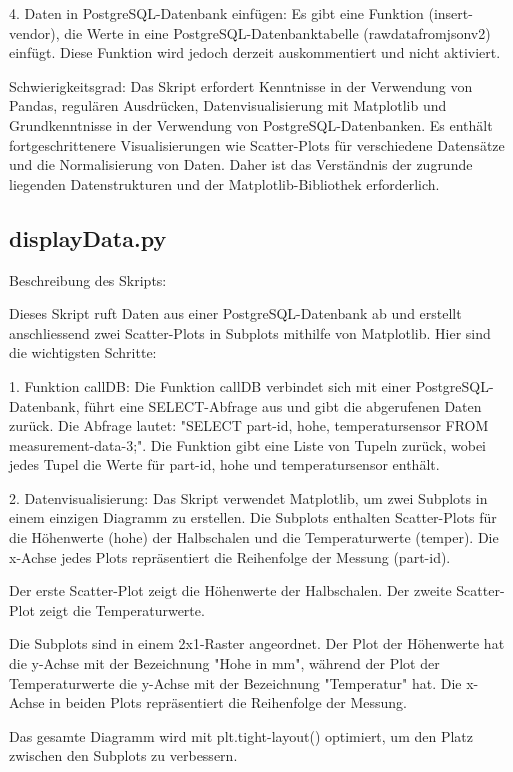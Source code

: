 4. Daten in PostgreSQL-Datenbank einfügen:
Es gibt eine Funktion (insert-vendor), die Werte in eine PostgreSQL-Datenbanktabelle (rawdatafromjsonv2) einfügt. Diese Funktion wird jedoch derzeit auskommentiert und nicht aktiviert.

Schwierigkeitsgrad:
Das Skript erfordert Kenntnisse in der Verwendung von Pandas, regulären Ausdrücken, Datenvisualisierung mit Matplotlib und Grundkenntnisse in der Verwendung von PostgreSQL-Datenbanken. Es enthält fortgeschrittenere Visualisierungen wie Scatter-Plots für verschiedene Datensätze und die Normalisierung von Daten. Daher ist das Verständnis der zugrunde liegenden Datenstrukturen und der Matplotlib-Bibliothek erforderlich.

\subsection{displayData.py}
Beschreibung des Skripts:

Dieses Skript ruft Daten aus einer PostgreSQL-Datenbank ab und erstellt anschliessend zwei Scatter-Plots in Subplots mithilfe von Matplotlib. Hier sind die wichtigsten Schritte:

1. Funktion callDB:
Die Funktion callDB verbindet sich mit einer PostgreSQL-Datenbank, führt eine SELECT-Abfrage aus und gibt die abgerufenen Daten zurück. Die Abfrage lautet: "SELECT part-id, hohe, temperatursensor FROM measurement-data-3;". Die Funktion gibt eine Liste von Tupeln zurück, wobei jedes Tupel die Werte für part-id, hohe und temperatursensor enthält.

2. Datenvisualisierung:
Das Skript verwendet Matplotlib, um zwei Subplots in einem einzigen Diagramm zu erstellen. Die Subplots enthalten Scatter-Plots für die Höhenwerte (hohe) der Halbschalen und die Temperaturwerte (temper). Die x-Achse jedes Plots repräsentiert die Reihenfolge der Messung (part-id).

    Der erste Scatter-Plot zeigt die Höhenwerte der Halbschalen.
    Der zweite Scatter-Plot zeigt die Temperaturwerte.

Die Subplots sind in einem 2x1-Raster angeordnet. Der Plot der Höhenwerte hat die y-Achse mit der Bezeichnung "Hohe in mm", während der Plot der Temperaturwerte die y-Achse mit der Bezeichnung "Temperatur" hat. Die x-Achse in beiden Plots repräsentiert die Reihenfolge der Messung.

Das gesamte Diagramm wird mit plt.tight-layout() optimiert, um den Platz zwischen den Subplots zu verbessern.


